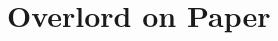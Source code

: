 \documentclass[noraggedright]{turabian-researchpaper}
\begin{document}
	
		



\section{Overlord on Paper} %






\end{document}
